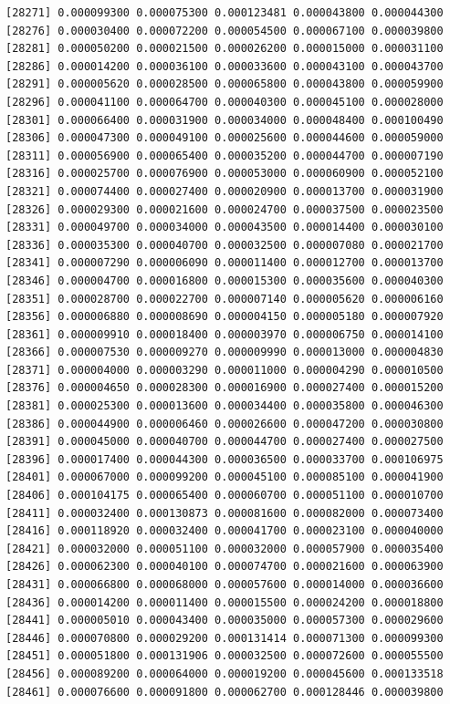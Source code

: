\documentclass[]{article}
\begin{document}
\begin{verbatim}
[28271] 0.000099300 0.000075300 0.000123481 0.000043800 0.000044300
[28276] 0.000030400 0.000072200 0.000054500 0.000067100 0.000039800
[28281] 0.000050200 0.000021500 0.000026200 0.000015000 0.000031100
[28286] 0.000014200 0.000036100 0.000033600 0.000043100 0.000043700
[28291] 0.000005620 0.000028500 0.000065800 0.000043800 0.000059900
[28296] 0.000041100 0.000064700 0.000040300 0.000045100 0.000028000
[28301] 0.000066400 0.000031900 0.000034000 0.000048400 0.000100490
[28306] 0.000047300 0.000049100 0.000025600 0.000044600 0.000059000
[28311] 0.000056900 0.000065400 0.000035200 0.000044700 0.000007190
[28316] 0.000025700 0.000076900 0.000053000 0.000060900 0.000052100
[28321] 0.000074400 0.000027400 0.000020900 0.000013700 0.000031900
[28326] 0.000029300 0.000021600 0.000024700 0.000037500 0.000023500
[28331] 0.000049700 0.000034000 0.000043500 0.000014400 0.000030100
[28336] 0.000035300 0.000040700 0.000032500 0.000007080 0.000021700
[28341] 0.000007290 0.000006090 0.000011400 0.000012700 0.000013700
[28346] 0.000004700 0.000016800 0.000015300 0.000035600 0.000040300
[28351] 0.000028700 0.000022700 0.000007140 0.000005620 0.000006160
[28356] 0.000006880 0.000008690 0.000004150 0.000005180 0.000007920
[28361] 0.000009910 0.000018400 0.000003970 0.000006750 0.000014100
[28366] 0.000007530 0.000009270 0.000009990 0.000013000 0.000004830
[28371] 0.000004000 0.000003290 0.000011000 0.000004290 0.000010500
[28376] 0.000004650 0.000028300 0.000016900 0.000027400 0.000015200
[28381] 0.000025300 0.000013600 0.000034400 0.000035800 0.000046300
[28386] 0.000044900 0.000006460 0.000026600 0.000047200 0.000030800
[28391] 0.000045000 0.000040700 0.000044700 0.000027400 0.000027500
[28396] 0.000017400 0.000044300 0.000036500 0.000033700 0.000106975
[28401] 0.000067000 0.000099200 0.000045100 0.000085100 0.000041900
[28406] 0.000104175 0.000065400 0.000060700 0.000051100 0.000010700
[28411] 0.000032400 0.000130873 0.000081600 0.000082000 0.000073400
[28416] 0.000118920 0.000032400 0.000041700 0.000023100 0.000040000
[28421] 0.000032000 0.000051100 0.000032000 0.000057900 0.000035400
[28426] 0.000062300 0.000040100 0.000074700 0.000021600 0.000063900
[28431] 0.000066800 0.000068000 0.000057600 0.000014000 0.000036600
[28436] 0.000014200 0.000011400 0.000015500 0.000024200 0.000018800
[28441] 0.000005010 0.000043400 0.000035000 0.000057300 0.000029600
[28446] 0.000070800 0.000029200 0.000131414 0.000071300 0.000099300
[28451] 0.000051800 0.000131906 0.000032500 0.000072600 0.000055500
[28456] 0.000089200 0.000064000 0.000019200 0.000045600 0.000133518
[28461] 0.000076600 0.000091800 0.000062700 0.000128446 0.000039800

\end{verbatim}
\end{document}
